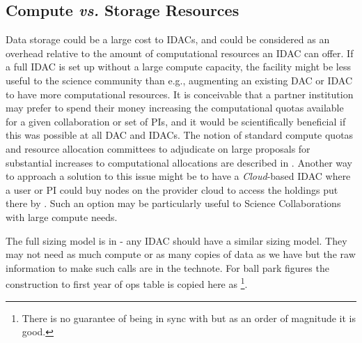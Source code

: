 \subsection{Compute {\it vs.} Storage Resources} \label{sec:cvs}
Data storage could be a large cost to IDACs, and could be considered as an overhead relative to the amount of computational resources an \gls{IDAC} can offer. If a full \gls{IDAC} is set up without a large compute capacity, the facility might be less useful to the science community than e.g., augmenting an existing DAC or \gls{IDAC} to have more computational resources. It is conceivable that a partner institution may prefer to spend their money increasing the computational quotas available for a given collaboration or set of PIs, and it would be scientifically beneficial if this was possible at all DAC and IDACs. The notion of standard compute quotas and resource allocation committees to adjudicate on large proposals for substantial increases to computational allocations are described in . Another way to approach a solution to this issue might be to have a \emph{Cloud}-based \gls{IDAC} where a user or \gls{PI} could buy nodes on the provider cloud to access the holdings put there by \RO.  Such an option may be particularly useful to Science Collaborations with large compute needs.

The full sizing model is in  - any \gls{IDAC} should have a similar sizing model. They may not need as much compute or as many copies of data as we have but the raw information to make such calls are in the technote.  For ball park figures the construction
to first year of ops table is copied here as \footnote{ There is no guarantee of being in sync with  but as an order of magnitude it is good.}.


